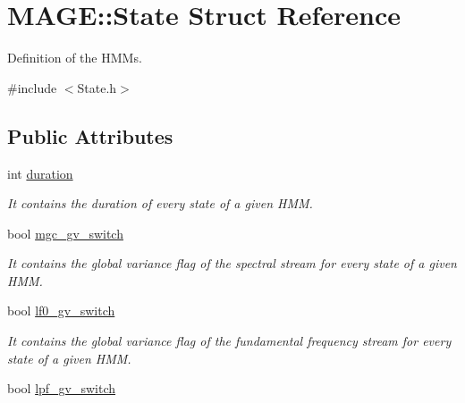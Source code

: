 \hypertarget{struct_m_a_g_e_1_1_state}{\section{M\-A\-G\-E\-:\-:State Struct Reference}
\label{struct_m_a_g_e_1_1_state}
}


Definition of the H\-M\-Ms.  




{\ttfamily \#include $<$State.\-h$>$}

\subsection*{Public Attributes}
\begin{DoxyCompactItemize}
\item 
\hypertarget{struct_m_a_g_e_1_1_state_a374a7cb32876f8190f7ee541283f969a}{int \hyperlink{struct_m_a_g_e_1_1_state_a374a7cb32876f8190f7ee541283f969a}{duration}}\label{struct_m_a_g_e_1_1_state_a374a7cb32876f8190f7ee541283f969a}

\begin{DoxyCompactList}\small\item\em It contains the duration of every state of a given H\-M\-M. \end{DoxyCompactList}\item 
\hypertarget{struct_m_a_g_e_1_1_state_af71881812290585c3ea318251c0bb3f5}{bool \hyperlink{struct_m_a_g_e_1_1_state_af71881812290585c3ea318251c0bb3f5}{mgc\-\_\-gv\-\_\-switch}}\label{struct_m_a_g_e_1_1_state_af71881812290585c3ea318251c0bb3f5}

\begin{DoxyCompactList}\small\item\em It contains the global variance flag of the spectral stream for every state of a given H\-M\-M. \end{DoxyCompactList}\item 
\hypertarget{struct_m_a_g_e_1_1_state_a77240283e31e92076c73ecc0f9dbc34f}{bool \hyperlink{struct_m_a_g_e_1_1_state_a77240283e31e92076c73ecc0f9dbc34f}{lf0\-\_\-gv\-\_\-switch}}\label{struct_m_a_g_e_1_1_state_a77240283e31e92076c73ecc0f9dbc34f}

\begin{DoxyCompactList}\small\item\em It contains the global variance flag of the fundamental frequency stream for every state of a given H\-M\-M. \end{DoxyCompactList}\item 
\hypertarget{struct_m_a_g_e_1_1_state_a174dfed9ae24aff59d3f69d0733478e5}{bool \hyperlink{struct_m_a_g_e_1_1_state_a174dfed9ae24aff59d3f69d0733478e5}{lpf\-\_\-gv\-\_\-switch}}\label{struct_m_a_g_e_1_1_state_a174dfed9ae24aff59d3f69d0733478e5}


\end{DoxyCompactItemize}
